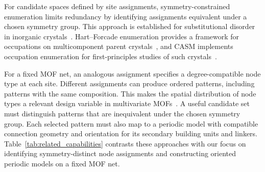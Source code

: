 \documentclass[a5paper, 10pt]{article}
\begin{document}
For candidate spaces defined by site assignments, symmetry-constrained enumeration limits redundancy by identifying assignments equivalent under a chosen symmetry group.
This approach is established for substitutional disorder in inorganic crystals~\cite{hart2012generating}. Hart--Forcade enumeration provides a framework for occupations on multicomponent parent crystals~\cite{hart2008algorithm}, and CASM implements occupation enumeration for first-principles studies of such crystals~\cite{PUCHALA2023111897}.%

For a fixed MOF net, an analogous assignment specifies a degree-compatible node type at each site. Different assignments can produce ordered patterns, including patterns with the same composition. This makes the spatial distribution of node types a relevant design variable in multivariate MOFs~\cite{ji2020sequencing}. A useful candidate set must distinguish patterns that are inequivalent under the chosen symmetry group. Each selected pattern must also map to a periodic model with compatible connection geometry and orientation for its secondary building units and linkers. Table~\ref{tab:related_capabilities} contrasts these approaches with our focus on identifying symmetry-distinct node assignments and constructing oriented periodic models on a fixed MOF net. %
\end{document}
